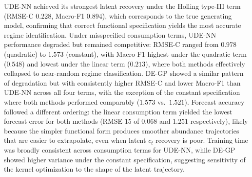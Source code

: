 \documentclass[openacc]{rsproca_new}%
\begin{document}
UDE-NN achieved its strongest latent recovery under the Holling type-III term (RMSE-C $0.228$, Macro-F1 $0.894$), which corresponds to the true generating model, confirming that correct functional specification yields the most accurate regime identification.
Under misspecified consumption terms, UDE-NN performance degraded but remained competitive: RMSE-C ranged from $0.978$ (quadratic) to $1.573$ (constant), with Macro-F1 highest under the quadratic term ($0.548$) and lowest under the linear term ($0.213$), where both methods effectively collapsed to near-random regime classification. DE-GP showed a similar pattern of degradation but with consistently higher RMSE-C and lower Macro-F1 than UDE-NN across all four terms, with the exception of the constant specification where both methods performed comparably ($1.573$ vs.\ $1.521$). Forecast accuracy followed a different ordering: the linear consumption term yielded the lowest forecast error for both methods (RMSE-15 of $0.068$ and $1.251$ respectively), likely because the simpler functional form produces smoother abundance trajectories that are easier to extrapolate, even when latent $c_t$ recovery is poor. Training time was broadly consistent across consumption terms for UDE-NN, while DE-GP showed higher variance under the constant specification, suggesting sensitivity of the kernel optimization to the shape of the latent trajectory.
\end{document}

